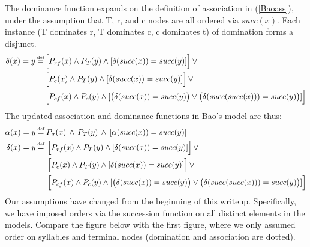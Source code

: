 \documentclass{article}
\newcommand\myeq{\mathrel{\stackrel{\makebox[0pt]{\mbox{\normalfont\tiny def}}}{=}}}
\begin{document}
The dominance function expands on the definition of association in (\ref{Baoass}), under the assumption that T, r, and c nodes are all ordered via $succ(x)$. Each instance (T dominates r, T dominates c, c dominates t) of domination forms a disjunct.
\begin{equation}
\begin{aligned}
\delta(x)=y\myeq\, &\Big[P_{rf}(x)\land P_{T}(y)\land[\delta(succ(x))=succ(y)]\Big]\,\lor \\
&\Big[P_{c}(x)\land P_{T}(y)\land[\delta(succ(x))=succ(y)]\Big]\,\lor \\
&\Big[P_{cf}(x)\land P_{c}(y)\land[\big(\delta(succ(x))=succ(y)\big)\lor\big(\delta(succ(succ(x)))=succ(y)\big)]\Big]
\end{aligned}
\end{equation}
The updated association and dominance functions in Bao's model are thus:
\begin{equation}
\begin{aligned}
\alpha(x)=y&\myeq P_{\sigma}(x)\,\land\,P_{T}(y)\,\land\,[\alpha(succ(x))=succ(y)] \\
\delta(x)=y&\myeq\, \Big[P_{rf}(x)\land P_{T}(y)\land[\delta(succ(x))=succ(y)]\Big]\,\lor \\
&\quad\,\,\,\Big[P_{c}(x)\land P_{T}(y)\land[\delta(succ(x))=succ(y)]\Big]\,\lor \\
&\quad\,\,\,\Big[P_{cf}(x)\land P_{c}(y)\land[\big(\delta(succ(x))=succ(y)\big)\lor\big(\delta(succ(succ(x)))=succ(y)\big)]\Big]
\end{aligned}
\end{equation}
Our assumptions have changed from the beginning of this writeup. Specifically, we have imposed orders via the succession function on all distinct elements in the models. Compare the figure below with the first figure, where we only assumed order on syllables and terminal nodes (domination and association are dotted).
\end{document}
